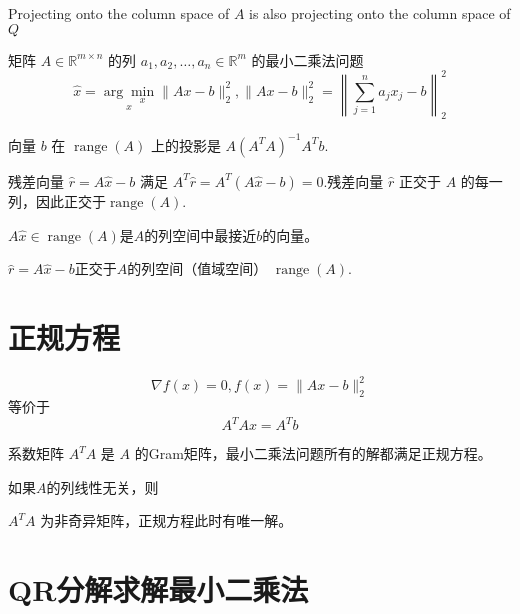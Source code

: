 \begin{FigureCenter}{Projecting onto the column space of $A$ is also projecting onto the column space of $Q$}
    
\end{FigureCenter}

矩阵 $ {A} \in \mathbb{R}^{m \times n} $ 的列 $ a_{1}, a_{2}, \ldots, a_{n} \in \mathbb{R}^{m} $ 的最小二乘法问题
\begin{equation}
\hat{x}=\underset{x}{\arg \underset{x}{\min}}\|A x-b\|_{2}^{2} ,\|A x-b\|_{2}^{2}=\left\|\sum_{j=1}^{n} a_{j} x_{j}-b\right\|_{2}^{2}
\end{equation}

向量 $ b $ 在 $ \operatorname{range}(A) $ 上的投影是 $ A\left(A^{T} A\right)^{-1} A^{T} b $.

残差向量 $ \hat{r}=A \hat{x}-b $ 满足 $ A^{T} \hat{r}=A^{T}(A \hat{x}-b)=0 $.残差向量 $ \hat{r} $ 正交于 $ A $ 的每一列，因此正交于$ \operatorname{range}(A) $.




\begin{theorem}
    $ A \hat{x} \in \operatorname{range}(A) $是$A$的列空间中最接近$b$的向量。 
    
    $ \hat{r}=A \hat{x} -b$正交于$A$的列空间（值域空间） $ \operatorname{range}(A) $.
\end{theorem}

\section{正规方程}

\begin{theorem}[最小二乘法问题的正规方程]

    \begin{equation} \nabla f(x)=0, f(x)=\|A x-b\|_{2}^{2} \end{equation}
等价于
\begin{equation}
A^{T} A x=A^{T} b
\end{equation}
\end{theorem}

系数矩阵 $ A^{T} A $ 是 $ A $ 的Gram矩阵，最小二乘法问题所有的解都满足正规方程。

\begin{theorem}
    如果$A$的列线性无关，则

    $ A^{T} A $ 为非奇异矩阵，正规方程此时有唯一解。
\end{theorem}


\section{QR分解求解最小二乘法}

